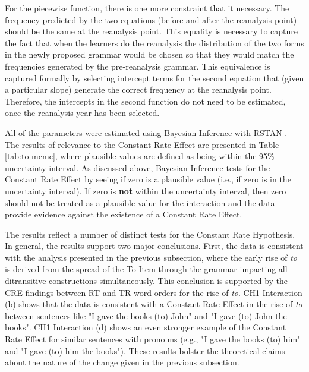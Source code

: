 	For the piecewise function, there is one more constraint that it necessary. The frequency predicted by the two equations (before and after the reanalysis point) should be the same at the reanalysis point. This equality is necessary to capture the fact that when the learners do the reanalysis the distribution of the two forms in the newly proposed grammar would be chosen so that they would match the frequencies generated by the pre-reanalysis grammar. This equivalence is captured formally by selecting intercept terms for the second equation that (given a particular slope) generate the correct frequency at the reanalysis point. Therefore, the intercepts in the second function do not need to be estimated, once the reanalysis year has been selected.

	All of the parameters were estimated using Bayesian Inference with RSTAN \citep{stan.2016}. The results of relevance to the Constant Rate Effect are presented in Table \ref{tab:to-mcmc}, where plausible values are defined as being within the 95\% uncertainty interval. As discussed above, Bayesian Inference tests for the Constant Rate Effect by seeing if zero is a plausible value (i.e., if zero is in the uncertainty interval). If zero is \textbf{not} within the uncertainty interval, then zero should not be treated as a plausible value for the interaction and the data provide evidence against the existence of a Constant Rate Effect.



   The results reflect a number of distinct tests for the Constant Rate Hypothesis. In general, the results support two major conclusions. First, the data is consistent with the analysis presented in the previous subsection, where the early rise of \textit{to} is derived from the spread of the To Item through the grammar impacting all ditransitive constructions simultaneously. This conclusion is supported by the CRE findings between RT and TR word orders for the rise of \textit{to}. CH1 Interaction (b) shows that the data is consistent with a Constant Rate Effect in the rise of \textit{to} between sentences like "I gave the books (to) John" and "I gave (to) John the books". CH1 Interaction (d) shows an even stronger example of the Constant Rate Effect for similar sentences with pronouns (e.g., "I gave the books (to) him" and "I gave (to) him the books"). These results bolster the theoretical claims about the nature of the change given in the previous subsection.

